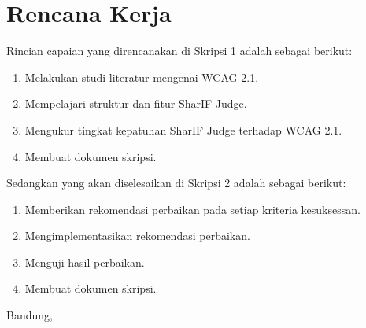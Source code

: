 \documentclass[a4paper,twoside]{article}
\begin{document}
\section{Rencana Kerja}
Rincian capaian yang direncanakan di Skripsi 1 adalah sebagai berikut:
\begin{enumerate}
	\item Melakukan studi literatur mengenai WCAG 2.1.
	\item Mempelajari struktur dan fitur SharIF Judge.
	\item Mengukur tingkat kepatuhan SharIF Judge terhadap WCAG 2.1.
	\item Membuat dokumen skripsi.
\end{enumerate}

Sedangkan yang akan diselesaikan di Skripsi 2 adalah sebagai berikut:
\begin{enumerate}
	\item Memberikan rekomendasi perbaikan pada setiap kriteria kesuksessan.
	\item Mengimplementasikan rekomendasi perbaikan.
	\item Menguji hasil perbaikan.
	\item Membuat dokumen skripsi.
\end{enumerate}

\vspace{1cm}
\centering Bandung, \tanggal\\
\vspace{2cm} \nama \\ 
\vspace{1cm}
\end{document}
